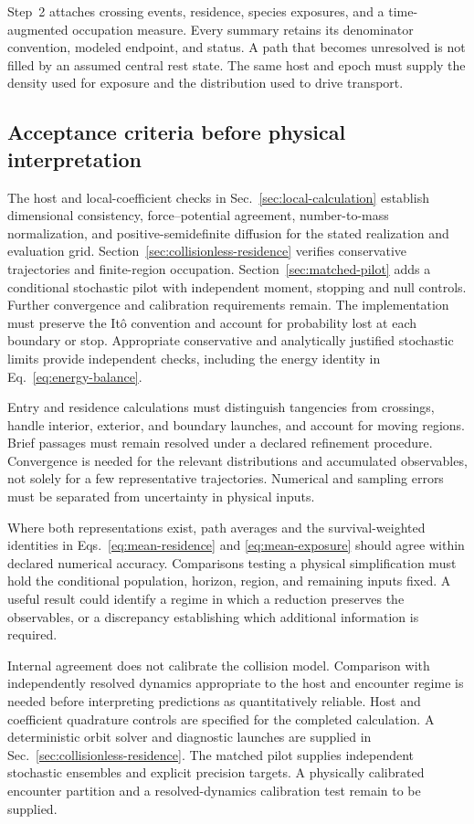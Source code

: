 \documentclass[aps,prd,reprint,amsmath,amssymb,superscriptaddress,nofootinbib,longbibliography,floatfix]{revtex4-2}
\begin{document}
Step~2 attaches crossing events, residence, species exposures, and a time-augmented occupation measure. Every summary retains its denominator convention, modeled endpoint, and status. A path that becomes unresolved is not filled by an assumed central rest state. The same host and epoch must supply the density used for exposure and the distribution used to drive transport.

\subsection{Acceptance criteria before physical interpretation}

The host and local-coefficient checks in Sec.~\ref{sec:local-calculation} establish dimensional consistency, force--potential agreement, number-to-mass normalization, and positive-semidefinite diffusion for the stated realization and evaluation grid. Section~\ref{sec:collisionless-residence} verifies conservative trajectories and finite-region occupation. Section~\ref{sec:matched-pilot} adds a conditional stochastic pilot with independent moment, stopping and null controls. Further convergence and calibration requirements remain. The implementation must preserve the It\^o convention and account for probability lost at each boundary or stop. Appropriate conservative and analytically justified stochastic limits provide independent checks, including the energy identity in Eq.~\eqref{eq:energy-balance}.

Entry and residence calculations must distinguish tangencies from crossings, handle interior, exterior, and boundary launches, and account for moving regions. Brief passages must remain resolved under a declared refinement procedure. Convergence is needed for the relevant distributions and accumulated observables, not solely for a few representative trajectories. Numerical and sampling errors must be separated from uncertainty in physical inputs.

Where both representations exist, path averages and the survival-weighted identities in Eqs.~\eqref{eq:mean-residence} and \eqref{eq:mean-exposure} should agree within declared numerical accuracy. Comparisons testing a physical simplification must hold the conditional population, horizon, region, and remaining inputs fixed. A useful result could identify a regime in which a reduction preserves the observables, or a discrepancy establishing which additional information is required.

Internal agreement does not calibrate the collision model. Comparison with independently resolved dynamics appropriate to the host and encounter regime is needed before interpreting predictions as quantitatively reliable. Host and coefficient quadrature controls are specified for the completed calculation. A deterministic orbit solver and diagnostic launches are supplied in Sec.~\ref{sec:collisionless-residence}. The matched pilot supplies independent stochastic ensembles and explicit precision targets. A physically calibrated encounter partition and a resolved-dynamics calibration test remain to be supplied.
\end{document}
